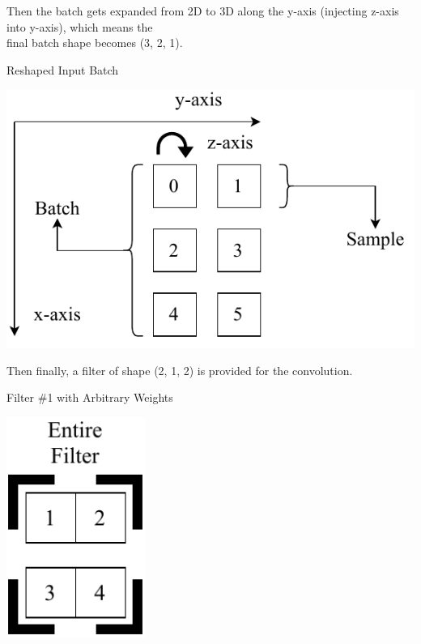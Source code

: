 \documentclass[a4paper, 12pt]{report}
\newcommand\tab[1][1cm]{\hspace*{#1}}
\begin{document}
\begin{tcbraster}[raster columns=2,raster rows=1,
	enhanced,size=small,fit algorithm=hybrid* ]
	\begin{tcolorbox}[frame hidden,colback=white]
		\tab Then the batch gets expanded from \tab 2D to 3D along the y-axis (injecting z-\tab axis into y-axis), which means the\\\tab final batch shape becomes (3, 2, 1).
	\end{tcolorbox}
	\begin{inlinefigure}{Reshaped Input Batch}
		\begin{center}
			\includegraphics[width=\textwidth]{input_reshaped}
		\end{center}
	\end{inlinefigure}
\end{tcbraster}
\begin{tcbraster}[raster columns=2,raster rows=1,
	enhanced,size=small,fit algorithm=hybrid* ]
	\begin{tcolorbox}[frame hidden,colback=white]
		\tab Then finally, a filter of shape (2, 1, 2) is \tab provided for the convolution.
	\end{tcolorbox}
	\begin{inlinefigure}{Filter \#1 with Arbitrary Weights}
		\begin{center}
			\includegraphics[width=0.34\textwidth]{filter1}
		\end{center}
	\end{inlinefigure}
\end{tcbraster}
\end{document}
